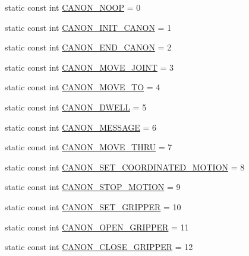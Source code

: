 \begin{DoxyCompactItemize}
\item 
static const int \hyperlink{structRCS_1_1CanonCmdType_a05e58302709ff5018a0796bf985abde9}{C\-A\-N\-O\-N\-\_\-\-N\-O\-O\-P} = 0
\item 
static const int \hyperlink{structRCS_1_1CanonCmdType_abec96d9884f37b2a230fe2831ca065ef}{C\-A\-N\-O\-N\-\_\-\-I\-N\-I\-T\-\_\-\-C\-A\-N\-O\-N} = 1
\item 
static const int \hyperlink{structRCS_1_1CanonCmdType_af9f9ed6ac700315f50622cb7c8ea72dc}{C\-A\-N\-O\-N\-\_\-\-E\-N\-D\-\_\-\-C\-A\-N\-O\-N} = 2
\item 
static const int \hyperlink{structRCS_1_1CanonCmdType_af57a00859dffbdc691174d1e373e4919}{C\-A\-N\-O\-N\-\_\-\-M\-O\-V\-E\-\_\-\-J\-O\-I\-N\-T} = 3
\item 
static const int \hyperlink{structRCS_1_1CanonCmdType_ad35a88bedd0d90392bb292084b6d8d7b}{C\-A\-N\-O\-N\-\_\-\-M\-O\-V\-E\-\_\-\-T\-O} = 4
\item 
static const int \hyperlink{structRCS_1_1CanonCmdType_a3548dd55f45965865ec8500020b26bd8}{C\-A\-N\-O\-N\-\_\-\-D\-W\-E\-L\-L} = 5
\item 
static const int \hyperlink{structRCS_1_1CanonCmdType_af96d039df71291b2f3b2fb9b0557395b}{C\-A\-N\-O\-N\-\_\-\-M\-E\-S\-S\-A\-G\-E} = 6
\item 
static const int \hyperlink{structRCS_1_1CanonCmdType_a9241b99306a092a28a7cc222c5043f14}{C\-A\-N\-O\-N\-\_\-\-M\-O\-V\-E\-\_\-\-T\-H\-R\-U} = 7
\item 
static const int \hyperlink{structRCS_1_1CanonCmdType_a0ca8d517d0f8246f46e95f3509a93f00}{C\-A\-N\-O\-N\-\_\-\-S\-E\-T\-\_\-\-C\-O\-O\-R\-D\-I\-N\-A\-T\-E\-D\-\_\-\-M\-O\-T\-I\-O\-N} = 8
\item 
static const int \hyperlink{structRCS_1_1CanonCmdType_aecb0f061d2e669dec27d272ed9e1d8c9}{C\-A\-N\-O\-N\-\_\-\-S\-T\-O\-P\-\_\-\-M\-O\-T\-I\-O\-N} = 9
\item 
static const int \hyperlink{structRCS_1_1CanonCmdType_a26f78b96bff373d0cc192a5843fd092e}{C\-A\-N\-O\-N\-\_\-\-S\-E\-T\-\_\-\-G\-R\-I\-P\-P\-E\-R} = 10
\item 
static const int \hyperlink{structRCS_1_1CanonCmdType_a4f12897aa5adf1424c660c686b1e18e6}{C\-A\-N\-O\-N\-\_\-\-O\-P\-E\-N\-\_\-\-G\-R\-I\-P\-P\-E\-R} = 11
\item 
static const int \hyperlink{structRCS_1_1CanonCmdType_a61505c90c817d45beb525609cd3a1e53}{C\-A\-N\-O\-N\-\_\-\-C\-L\-O\-S\-E\-\_\-\-G\-R\-I\-P\-P\-E\-R} = 12
\item 

\end{DoxyCompactItemize}
